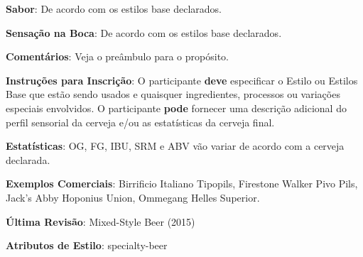 \textbf{Sabor}: De acordo com os estilos base declarados.

\textbf{Sensação na Boca}: De acordo com os estilos base declarados.

\textbf{Comentários}: Veja o preâmbulo para o propósito.

\textbf{Instruções para Inscrição}: O participante \textbf{deve} especificar o Estilo ou Estilos Base que estão sendo usados e quaisquer ingredientes, processos ou variações especiais envolvidos. O participante \textbf{pode} fornecer uma descrição adicional do perfil sensorial da cerveja e/ou as estatísticas da cerveja final.

\textbf{Estatísticas}: OG, FG, IBU, SRM e ABV vão variar de acordo com a cerveja declarada.

\textbf{Exemplos Comerciais}: Birrificio Italiano Tipopils, Firestone Walker Pivo Pils, Jack’s Abby Hoponius Union, Ommegang Helles Superior.

\textbf{Última Revisão}: Mixed-Style Beer (2015)

\textbf{Atributos de Estilo}: specialty-beer
